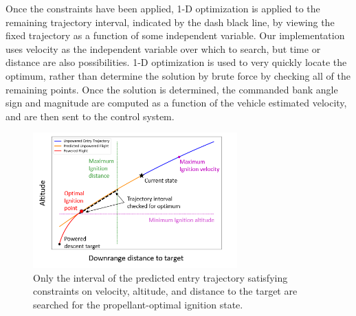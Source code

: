 Once the constraints have been applied, 1-D optimization is applied to the remaining trajectory interval, indicated by the dash black line, by viewing the fixed trajectory as a function of some independent variable. Our implementation uses velocity as the independent variable over which to search, but time or distance are also possibilities. 1-D optimization is used to very quickly locate the optimum, rather than determine the solution by brute force by checking all of the remaining points. Once the solution is determined, the commanded bank angle sign and magnitude are computed as a function of the vehicle estimated velocity, and are then sent to the control system.
\begin{figure}[h!]
	\centering
	\includegraphics[width=0.7\textwidth]{../AAS20/H_Vs_S} 
	\caption{Only the interval of the predicted entry trajectory satisfying constraints on velocity, altitude, and distance to the target are searched for the propellant-optimal ignition state.}
	\label{fig_ignition}
\end{figure}


